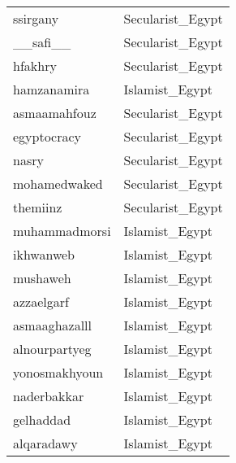 \begin{longtable}{ll}
  ssirgany & Secularist\_Egypt \\ 
  \_\_safi\_\_ & Secularist\_Egypt \\ 
  hfakhry & Secularist\_Egypt \\ 
  hamzanamira & Islamist\_Egypt \\ 
  asmaamahfouz & Secularist\_Egypt \\ 
  egyptocracy & Secularist\_Egypt \\ 
  nasry & Secularist\_Egypt \\ 
  mohamedwaked & Secularist\_Egypt \\ 
  themiinz & Secularist\_Egypt \\ 
  muhammadmorsi & Islamist\_Egypt \\ 
  ikhwanweb & Islamist\_Egypt \\ 
  mushaweh & Islamist\_Egypt \\ 
  azzaelgarf & Islamist\_Egypt \\ 
  asmaaghazalll & Islamist\_Egypt \\ 
  alnourpartyeg & Islamist\_Egypt \\ 
  yonosmakhyoun & Islamist\_Egypt \\ 
  naderbakkar & Islamist\_Egypt \\ 
  gelhaddad & Islamist\_Egypt \\ 
  alqaradawy & Islamist\_Egypt \\ 
   \bottomrule
\end{longtable}
